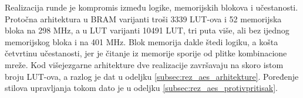 \begin{table}[H]
\caption{Višejezgarna arhitektura, implementacija van konteksta}
\centering
{\renewcommand{\arraystretch}{1.25}
}
\label{tab:aes_impl_multi}
\end{table}

Realizacija runde je kompromis između logike, memorijskih blokova i učestanosti. Protočna arhitektura u BRAM varijanti troši 3339 LUT-ova i 52 memorijska bloka na 298 MHz, a u LUT varijanti 10491 LUT, tri puta više, ali bez ijednog memorijskog bloka i na 401 MHz. Blok memorija dakle štedi logiku, a košta četvrtinu učestanosti, jer je čitanje iz memorije sporije od plitke kombinacione mreže. Kod višejezgarne arhitekture dve realizacije završavaju na skoro istom broju LUT-ova, a razlog je dat u odeljku \ref{subsec:rez_aes_arhitekture}. Poređenje stilova upravljanja tokom dato je u odeljku \ref{subsec:rez_aes_protivpritisak}.

